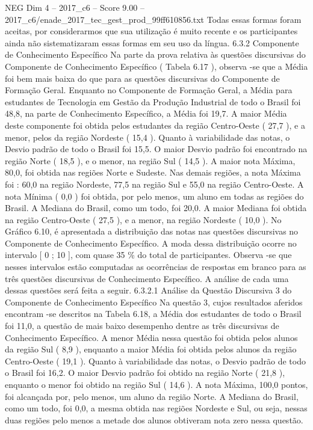 \begin{textsample}{NEG Dim 4 – 2017\_c6 – Score 9.00 – 2017\_c6/enade\_2017\_tec\_gest\_prod\_99ff610856.txt}
Todas essas formas foram aceitas, por considerarmos que sua utilização é muito recente e os participantes ainda não sistematizaram essas formas em seu uso da língua. 6.3.2 Componente de Conhecimento Específico Na parte da prova relativa às questões discursivas do Componente de Conhecimento Específico ( Tabela 6.17 ), observa -se que a Média foi bem mais baixa do que para as questões discursivas do Componente de Formação Geral.
Enquanto no Componente de Formação Geral, a Média para estudantes de Tecnologia em Gestão da Produção Industrial de todo o Brasil foi 48,8, na parte de Conhecimento Específico, a Média foi 19,7.
A maior Média deste componente foi obtida pelos estudantes da região Centro-Oeste ( 27,7 ), e a menor, pelos da região Nordeste ( 15,4 ).
Quanto à variabilidade das notas, o Desvio padrão de todo o Brasil foi 15,5.
O maior Desvio padrão foi encontrado na região Norte ( 18,5 ), e o menor, na região Sul ( 14,5 ).
A maior nota Máxima, 80,0, foi obtida nas regiões Norte e Sudeste.
Nas demais regiões, a nota Máxima foi : 60,0 na região Nordeste, 77,5 na região Sul e 55,0 na região Centro-Oeste.
A nota Mínima ( 0,0 ) foi obtida, por pelo menos, um aluno em todas as regiões do Brasil.
A Mediana do Brasil, como um todo, foi 20,0.
A maior Mediana foi obtida na região Centro-Oeste ( 27,5 ), e a menor, na região Nordeste ( 10,0 ).
No Gráfico 6.10, é apresentada a distribuição das notas nas questões discursivas no Componente de Conhecimento Específico.
A moda dessa distribuição ocorre no intervalo [ 0 ; 10 ], com quase 35 \% do total de participantes.
Observa -se que nesses intervalos estão computadas as ocorrências de respostas em branco para as três questões discursivas de Conhecimento Específico.
A análise de cada uma dessas questões será feita a seguir. 6.3.2.1 Análise da Questão Discursiva 3 do Componente de Conhecimento Específico Na questão 3, cujos resultados aferidos encontram -se descritos na Tabela 6.18, a Média dos estudantes de todo o Brasil foi 11,0, a questão de mais baixo desempenho dentre as três discursivas de Conhecimento Específico.
A menor Média nessa questão foi obtida pelos alunos da região Sul ( 8,9 ), enquanto a maior Média foi obtida pelos alunos da região Centro-Oeste ( 19,1 ).
Quanto à variabilidade das notas, o Desvio padrão de todo o Brasil foi 16,2.
O maior Desvio padrão foi obtido na região Norte ( 21,8 ), enquanto o menor foi obtido na região Sul ( 14,6 ).
A nota Máxima, 100,0 pontos, foi alcançada por, pelo menos, um aluno da região Norte.
A Mediana do Brasil, como um todo, foi 0,0, a mesma obtida nas regiões Nordeste e Sul, ou seja, nessas duas regiões pelo menos a metade dos alunos obtiveram nota zero nessa questão.

\end{textsample}
